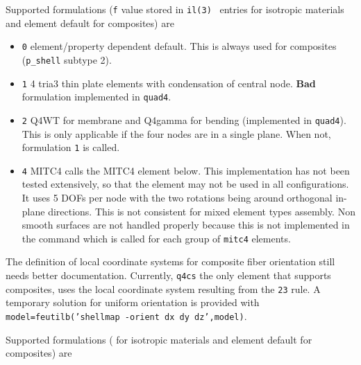 
Supported formulations ({\tt f} value stored in {\tt il(3)} \pshell\ entries for isotropic materials and element default for composites) are 

\begin{itemize}
 \item {\tt 0} element/property dependent default. This is always used for composites ({\tt p\_shell} subtype 2). 
 \item {\tt 1} 4 tria3 thin plate elements with condensation of central node. {\bf Bad} formulation implemented in {\tt quad4}. 
 \item {\tt 2} Q4WT for membrane and Q4gamma for bending (implemented in {\tt quad4}). This is only applicable if the four nodes are in a single plane. When not, formulation {\tt 1} is called.
 \item {\tt 4} MITC4 calls the MITC4 element below. This implementation has not been tested extensively, so that the element may not be used in all configurations.  It uses 5 DOFs per node with the two rotations being around orthogonal in-plane directions. This is not consistent for mixed element types assembly. Non smooth surfaces are not handled properly because this is not implemented in the  command which is called for each group of {\tt mitc4} elements. 
\end{itemize}

\begin{SDT}
The definition of local coordinate systems for composite fiber orientation still needs better documentation. Currently, {\tt q4cs} the only element that supports composites, uses the local coordinate system resulting from the  {\tt 23} rule. A temporary solution for uniform orientation is provided with {\tt model=feutilb('shellmap -orient dx dy dz',model)}. 
\end{SDT}



Supported formulations ( for isotropic materials and element default for composites) are 

